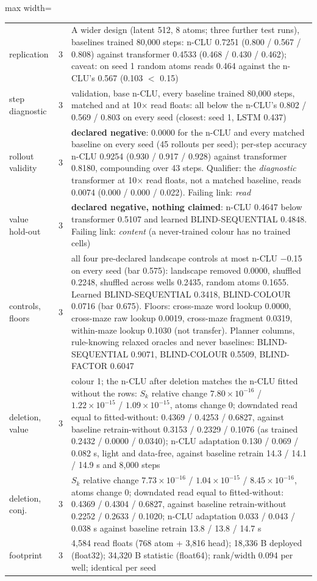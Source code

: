 \documentclass{article} %
\newcommand{\sci}[2]{\ensuremath{#1\times10^{#2}}}
\begin{document}
\begin{table}[h]
\begin{adjustbox}{max width=\linewidth}
\begin{tabular}{p{1.9cm}p{1.2cm}p{10.0cm}}
\quad replication & 3 & A wider design (latent 512, 8 atoms; three further test runs), baselines trained 80,000 steps: n-CLU 0.7251 (0.800 / 0.567 / 0.808) against transformer 0.4533 (0.468 / 0.430 / 0.462); caveat: on seed 1 random atoms reads 0.464 against the n-CLU's 0.567 (0.103 $<$ 0.15) \\ %
\quad step diagnostic & 3 & validation, base n-CLU, every baseline trained 80,000 steps, matched and at 10$\times$ read floats: all below the n-CLU's 0.802 / 0.569 / 0.803 on every seed (closest: seed 1, LSTM 0.437) \\
rollout validity & 3 & \textbf{declared negative}: 0.0000 for the n-CLU and every matched baseline on every seed (45 rollouts per seed); per-step accuracy n-CLU 0.9254 (0.930 / 0.917 / 0.928) against transformer 0.8180, compounding over 43 steps. Qualifier: the \emph{diagnostic} transformer at 10$\times$ read floats, not a matched baseline, reads 0.0074 (0.000 / 0.000 / 0.022). Failing link: \emph{read} \\
value hold-out & 3 & \textbf{declared negative, nothing claimed}: n-CLU 0.4647 below transformer 0.5107 and learned BLIND-SEQUENTIAL 0.4848. Failing link: \emph{content} (a never-trained colour has no trained cells) \\
controls, floors & 3 & all four pre-declared landscape controls at most n-CLU $-$0.15 on every seed (bar 0.575): landscape removed 0.0000, shuffled 0.2248, shuffled across wells 0.2435, random atoms 0.1655. Learned BLIND-SEQUENTIAL 0.3418, BLIND-COLOUR 0.0716 (bar 0.675). Floors: cross-maze word lookup 0.0000, cross-maze raw lookup 0.0019, cross-maze fragment 0.0319, within-maze lookup 0.1030 (not transfer). Planner columns, rule-knowing relaxed oracles and never baselines: BLIND-SEQUENTIAL 0.9071, BLIND-COLOUR 0.5509, BLIND-FACTOR 0.6047 \\
deletion, value & 3 & colour 1; the n-CLU after deletion matches the n-CLU fitted without the rows: $S_k$ relative change \sci{7.80}{-16} / \sci{1.22}{-15} / \sci{1.09}{-15}, atoms change 0; downdated read equal to fitted-without: 0.4369 / 0.4253 / 0.6827, against baseline retrain-without 0.3153 / 0.2329 / 0.1076 (as trained 0.2432 / 0.0000 / 0.0340); n-CLU adaptation 0.130 / 0.069 / 0.082 s, light and data-free, against baseline retrain 14.3 / 14.1 / 14.9 s and 8,000 steps \\
deletion, conj. & 3 & $S_k$ relative change \sci{7.73}{-16} / \sci{1.04}{-15} / \sci{8.45}{-16}, atoms change 0; downdated read equal to fitted-without: 0.4369 / 0.4304 / 0.6827, against baseline retrain-without 0.2252 / 0.2633 / 0.1020; n-CLU adaptation 0.033 / 0.043 / 0.038 s against baseline retrain 13.8 / 13.8 / 14.7 s \\
footprint & 3 & 4,584 read floats (768 atom + 3,816 head); 18,336 B deployed (float32); 34,320 B statistic (float64); rank/width 0.094 per well; identical per seed \\
\bottomrule
\end{tabular}\end{adjustbox}
\end{table}
\end{document}
